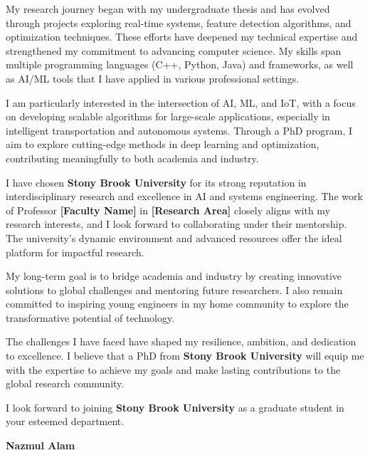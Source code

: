 \documentclass[11pt]{article}
\newif\ifshowsections
\begin{document}
\ifshowsections\section*{Research Interests}\fi

My research journey began with my undergraduate thesis and has evolved through projects exploring real-time
systems, feature detection algorithms, and optimization techniques. These efforts have deepened my technical
expertise and strengthened my commitment to advancing computer science. My skills span multiple programming
languages (C++, Python, Java) and frameworks, as well as AI/ML tools that I have applied in various professional
settings.

I am particularly interested in the intersection of AI, ML, and IoT, with a focus on developing scalable algorithms
for large-scale applications, especially in intelligent transportation and autonomous systems. Through a PhD program,
I aim to explore cutting-edge methods in deep learning and optimization, contributing meaningfully to both academia
and industry.

\ifshowsections\section*{Motivation and Future Goals}\fi

I have chosen \textbf{Stony Brook University} for its strong reputation in interdisciplinary research and excellence
in AI and systems engineering. The work of Professor \textbf{[Faculty Name]} in \textbf{[Research Area]} closely aligns
with my research interests, and I look forward to collaborating under their mentorship. The university’s dynamic
environment and advanced resources offer the ideal platform for impactful research.

My long-term goal is to bridge academia and industry by creating innovative solutions to global challenges and
mentoring future researchers. I also remain committed to inspiring young engineers in my home community to explore
the transformative potential of technology.

\ifshowsections\section*{Conclusion}\fi

The challenges I have faced have shaped my resilience, ambition, and dedication to excellence. I believe that a
PhD from \textbf{Stony Brook University} will equip me with the expertise to achieve my goals and make lasting
contributions to the global research community.

I look forward to joining \textbf{Stony Brook University} as a graduate student in your esteemed department.

\begin{flushleft}
    \vspace{1.5em}
    \textbf{Nazmul Alam}
\end{flushleft}
\end{document}
